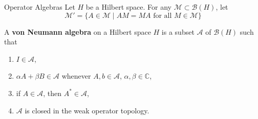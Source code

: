 \documentclass{beamer}
\begin{document}
        \begin{frame}{Operator Algebras}
            Let \(H\) be a Hilbert space. For any \(\mathcal{M} \subset \mathcal{B}(H)\), let \[\mathcal{M}'=\{A \in \mathcal{M} \mid AM=MA \mbox{ for all } M \in \mathcal{M}\}\]
            
        A \textbf{von Neumann algebra} on a Hilbert space \(H\) is a subset \(\mathcal{A}\) of \(\mathcal{B}(H)\) such that
        \begin{enumerate}
            \item \(I \in \mathcal{A}\),
            \item \(\alpha A + \beta B \in \mathcal{A}\) whenever \(A,b \in \mathcal{A}\), \(\alpha,\beta \in \mathbb{C}\),
            \item if \(A \in \mathcal{A}\), then \(A^\ast \in \mathcal{A}\),
            \item \(\mathcal{A}\) is closed in the weak operator topology.
        \end{enumerate}
        \end{frame}
\end{document}

